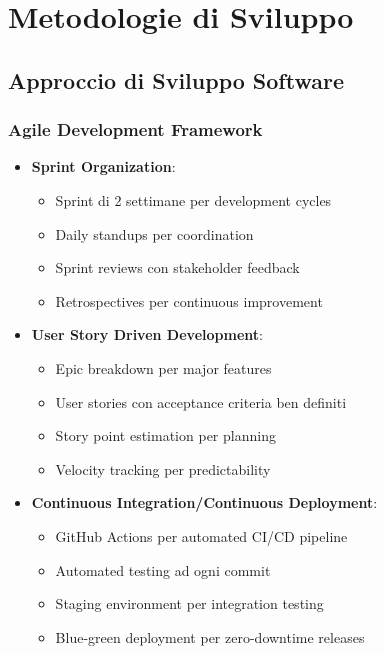 \documentclass[12pt,a4paper]{report}
\begin{document}
\section{Metodologie di Sviluppo}

\subsection{Approccio di Sviluppo Software}

\subsubsection{Agile Development Framework}

\begin{itemize}
    \item \textbf{Sprint Organization}:
    \begin{itemize}
        \item Sprint di 2 settimane per development cycles
        \item Daily standups per coordination
        \item Sprint reviews con stakeholder feedback
        \item Retrospectives per continuous improvement
    \end{itemize}
    
    \item \textbf{User Story Driven Development}:
    \begin{itemize}
        \item Epic breakdown per major features
        \item User stories con acceptance criteria ben definiti
        \item Story point estimation per planning
        \item Velocity tracking per predictability
    \end{itemize}
    
    \item \textbf{Continuous Integration/Continuous Deployment}:
    \begin{itemize}
        \item GitHub Actions per automated CI/CD pipeline
        \item Automated testing ad ogni commit
        \item Staging environment per integration testing
        \item Blue-green deployment per zero-downtime releases
    \end{itemize}
\end{itemize}
\end{document}
